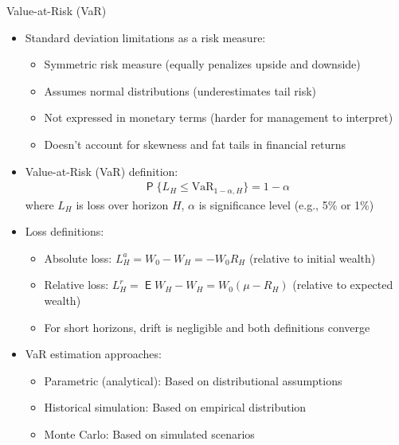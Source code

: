\documentclass[10pt]{beamer}
\DeclareMathOperator\prb{\mathsf{P}}
\DeclareMathOperator\expc{\mathsf{E}}
\begin{document}
\begin{frame}{Value-at-Risk (VaR)}
  \begin{itemize}[<+->]
    \item Standard deviation limitations as a risk measure:
      \begin{itemize}
        \item Symmetric risk measure (equally penalizes upside and downside)
        \item Assumes normal distributions (underestimates tail risk)
        \item Not expressed in monetary terms (harder for management to interpret)
        \item Doesn't account for skewness and fat tails in financial returns
      \end{itemize}
    \item Value-at-Risk (VaR) definition:
      \begin{align*}
        \prb\{L_H \leqslant \text{VaR}_{1-\alpha,H}\} = 1 - \alpha
      \end{align*}
      where $L_H$ is loss over horizon $H$, $\alpha$ is significance level (e.g., 5\% or 1\%)
      
    \item Loss definitions:
      \begin{itemize}
        \item Absolute loss: $L_H^a = W_0 - W_H = -W_0R_H$ (relative to initial wealth)
        \item Relative loss: $L_H^r = \expc{W_H} - W_H = W_0(\mu - R_H)$ (relative to expected wealth)
        \item For short horizons, drift is negligible and both definitions converge
      \end{itemize}
    
    \item VaR estimation approaches:
      \begin{itemize}
        \item Parametric (analytical): Based on distributional assumptions
        \item Historical simulation: Based on empirical distribution
        \item Monte Carlo: Based on simulated scenarios
      \end{itemize}
  \end{itemize}
\end{frame}
\end{document}
